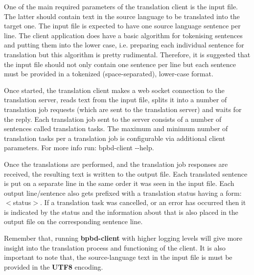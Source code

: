  One of the main required parameters of the translation client is the input file. The latter should contain text in the source language to be translated into the target one. The input file is expected to have one source language sentence per line. The client application does have a basic algorithm for tokenising sentences and putting them into the lower case, i.\+e. preparing each individual sentence for translation but this algorithm is pretty rudimental. Therefore, it is suggested that the input file should not only contain one sentence per line but each sentence must be provided in a tokenized (space-\/separated), lower-\/case format.

Once started, the translation client makes a web socket connection to the translation server, reads text from the input file, splits it into a number of translation job requests (which are sent to the translation server) and waits for the reply. Each translation job sent to the server consists of a number of sentences called translation tasks. The maximum and minimum number of translation tasks per a translation job is configurable via additional client parameters. For more info run\+: {\ttfamily bpbd-\/client -\/-\/help}.

Once the translations are performed, and the translation job responses are received, the resulting text is written to the output file. Each translated sentence is put on a separate line in the same order it was seen in the input file. Each output line/sentence also gets prefixed with a translation status having a form\+: {\ttfamily $<$status$>$}. If a translation task was cancelled, or an error has occurred then it is indicated by the status and the information about that is also placed in the output file on the corresponding sentence line.

Remember that, running {\bfseries bpbd-\/client} with higher logging levels will give more insight into the translation process and functioning of the client. It is also important to note that, the source-\/language text in the input file is must be provided in the {\bfseries U\+T\+F8} encoding.

